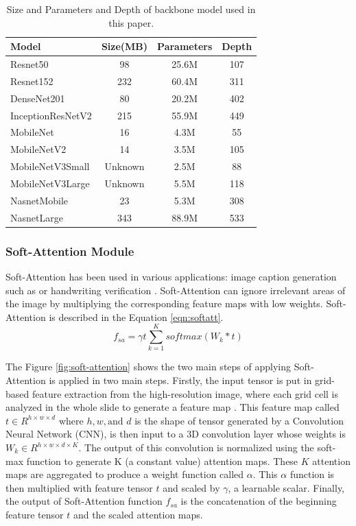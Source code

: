 \documentclass[sensors,article,submit,pdftex,moreauthors]{Definitions/mdpi}
\begin{document}
\begin{table}[H]
	\centering
	\begin{tabular}{|l | c c c|} 
		\hline
		Model & Size(MB) & Parameters & Depth \\ 
		\hline
		Resnet50 & 98 & 25.6M & 107 \\ 
		\hline
		Resnet152 & 232 & 60.4M & 311 \\ 
		\hline
		DenseNet201 & 80 & 20.2M & 402 \\
		\hline
		InceptionResNetV2 & 215 & 55.9M & 449 \\
		\hline
		MobileNet & 16 & 4.3M & 55 \\ 
		\hline
		MobileNetV2 & 14 & 3.5M & 105 \\ 
		\hline
		MobileNetV3Small & Unknown & 2.5M & 88 \\ 
		\hline
		MobileNetV3Large & Unknown & 5.5M & 118 \\
		\hline
		NasnetMobile & 23 & 5.3M & 308 \\
		\hline
		NasnetLarge & 343 & 88.9M & 533 \\ 
		\hline
	\end{tabular}
	\caption{Size and Parameters and Depth of backbone model used in this paper.}
	\label{table:model-summary}
\end{table}

\subsubsection{Soft-Attention Module}
Soft-Attention has been used in various applications: image caption generation such as \cite{03044} or handwriting verification \cite{202017}. Soft-Attention can ignore irrelevant areas of the image by multiplying the corresponding feature maps with low weights. Soft-Attention is described in the Equation \ref{eqn:softatt}.
\begin{equation}
	\label{eqn:softatt}
	f_{sa} = \gamma t\sum_{k=1}^{K}softmax(W_k * t)
\end{equation}

The Figure \ref{fig:soft-attention} shows the two main steps of applying Soft-Attention is applied in two main steps. Firstly, the input tensor is put in grid-based feature extraction from the high-resolution image, where each grid cell is analyzed in the whole slide to generate a feature map \cite{08513}. This feature map called $t \in R^{h \times w \times d}$ where $h, w, \text{and } d$ is the shape of tensor generated by a Convolution Neural Network (CNN), is then input to a 3D convolution layer whose weights is $W_k \in R^{h \times w \times d \times K}$. The output of this convolution is normalized using the soft-max function to generate K (a constant value) attention maps. These $K$ attention maps are aggregated to produce a weight function called $\alpha$. This $\alpha$ function is then multiplied with feature tensor $t$ and scaled by $\gamma$, a learnable scalar. Finally, the output of Soft-Attention function $f_{sa}$ is the concatenation of the beginning feature tensor $t$ and the scaled attention maps. 
\end{document}
